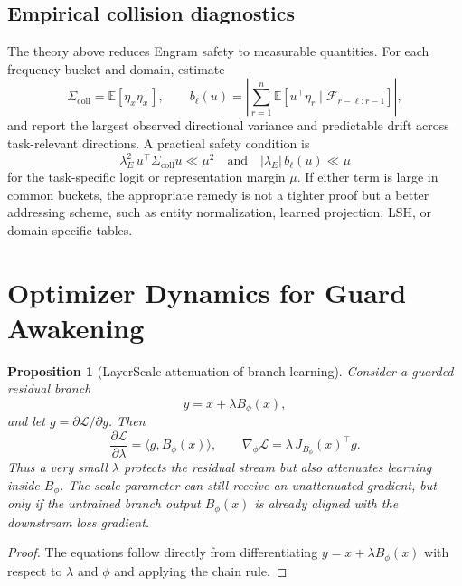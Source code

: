 \documentclass[11pt]{article}
\newtheorem{proposition}[theorem]{Proposition}
\newcommand{\E}{\mathbb{E}}
\begin{document}
\subsection{Empirical collision diagnostics}

The theory above reduces Engram safety to measurable quantities. For each frequency bucket and domain, estimate
\begin{equation}
\Sigma_{\mathrm{coll}} = \E[\eta_x\eta_x^\top],
\qquad
b_\ell(u)=\left|\sum_{r=1}^{n}\E[u^\top\eta_r\mid\mathcal{F}_{r-\ell:r-1}]\right|,
\end{equation}
and report the largest observed directional variance and predictable drift across task-relevant directions. A practical safety condition is
\begin{equation}
\lambda_E^2\,u^\top\Sigma_{\mathrm{coll}}u \ll \mu^2
\quad\text{and}\quad
|\lambda_E|\,b_\ell(u)\ll \mu
\end{equation}
for the task-specific logit or representation margin $\mu$. If either term is large in common buckets, the appropriate remedy is not a tighter proof but a better addressing scheme, such as entity normalization, learned projection, LSH, or domain-specific tables.

\section{Optimizer Dynamics for Guard Awakening}
\label{app:optimizer}

\begin{proposition}[LayerScale attenuation of branch learning]
\label{prop:layerscale-grad}
Consider a guarded residual branch
\begin{equation}
y=x+\lambda B_\phi(x),
\end{equation}
and let $g=\partial\mathcal{L}/\partial y$. Then
\begin{equation}
\frac{\partial\mathcal{L}}{\partial\lambda}=\langle g,B_\phi(x)\rangle,
\qquad
\nabla_\phi\mathcal{L}=\lambda\,J_{B_\phi}(x)^\top g.
\end{equation}
Thus a very small $\lambda$ protects the residual stream but also attenuates learning inside $B_\phi$. The scale parameter can still receive an unattenuated gradient, but only if the untrained branch output $B_\phi(x)$ is already aligned with the downstream loss gradient.
\end{proposition}

\begin{proof}
The equations follow directly from differentiating $y=x+\lambda B_\phi(x)$ with respect to $\lambda$ and $\phi$ and applying the chain rule.
\end{proof}
\end{document}
